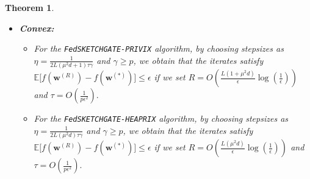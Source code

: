 \documentclass[twoside]{article}
\newtheorem{theorem}{Theorem}
\begin{document}
\begin{theorem}
\begin{itemize}
     \item \textbf{Convex:}
     \begin{itemize}
         \item[1)]For the \texttt{FedSKETCHGATE-PRIVIX} algorithm, by choosing stepsizes as $\eta=\frac{1}{2L\left(\mu^2d+1\right)\tau\gamma}$ and $\gamma\geq p$, we obtain that the iterates satisfy $ \mathbb{E}\Big[f({\boldsymbol{w}}^{(R)})-f({\boldsymbol{w}}^{(*)})\Big]\leq \epsilon$ if we set
     $R=O\left(\frac{L\left(1+\mu^2d\right)}{\epsilon}\log\left(\frac{1}{\epsilon}\right)\right)$ and $ \tau=O\left(\frac{1}{p\epsilon^2}\right).$
         \item[2)] For the \texttt{FedSKETCHGATE-HEAPRIX} algorithm,
by choosing stepsizes as $\eta=\frac{1}{2L\left(\mu^2d\right)\tau\gamma}$ and $\gamma\geq p$, we obtain that the iterates satisfy $ \mathbb{E}\Big[f({\boldsymbol{w}}^{(R)})-f({\boldsymbol{w}}^{(*)})\Big]\leq \epsilon$ if we set
     $R=O\left(\frac{L\left(\mu^2d\right)}{\epsilon}\log\left(\frac{1}{\epsilon}\right)\right)$ and $ \tau=O\left(\frac{1}{p\epsilon^2}\right).$ 
     \end{itemize}
 \end{itemize}
\end{theorem}
\end{document}
